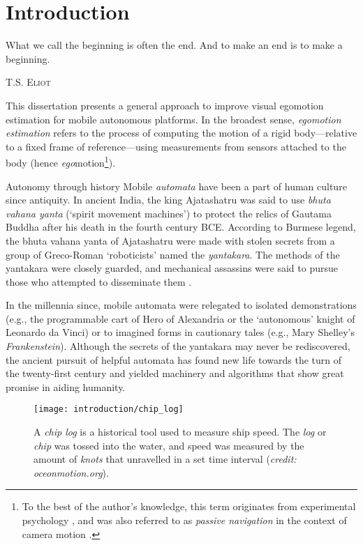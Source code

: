 \chapter{Introduction}
\label{ch:intro}
\epigraph{What we call the beginning is often the end. And to make an end is to make a beginning.}{\textsc{T.S. Eliot}}


This dissertation presents a general approach to improve visual egomotion estimation for mobile autonomous platforms.  In the broadest sense, \textit{egomotion estimation} refers to the process of computing the motion of a rigid body---relative to a fixed frame of reference---using measurements from sensors attached to the body (hence \textit{ego}motion\footnote{To the best of the author's knowledge, this term originates from experimental psychology \citep{warren1976perception}, and was also referred to as \textit{passive navigation} in the context of camera motion \citep{bruss_passive_1983}.}).  
\begin{remark}{Autonomy through history}
Mobile \textit{automata} have been a part of human culture since antiquity. In ancient India, the king Ajatashatru was said to use \textit{bhuta vahana yanta} (`spirit movement machines') to protect the relics of Gautama Buddha after his death in the fourth century BCE. According to Burmese legend, the bhuta vahana yanta of Ajatashatru were made with stolen secrets from a group of Greco-Roman `roboticists' named the \textit{yantakara}. The methods of the yantakara were closely guarded, and mechanical assassins were said to pursue those who attempted to disseminate them \citep{MayorGodsRobots2019}.

In the millennia since, mobile automata were relegated to isolated demonstrations (e.g., the programmable cart of Hero of Alexandria or the `autonomous' knight of Leonardo da Vinci) or to imagined forms in cautionary tales (e.g., Mary Shelley's \textit{Frankenstein}). Although the secrets of the yantakara may never be rediscovered, the ancient pursuit of helpful automata has found new life towards the turn of the twenty-first century and yielded machinery and algorithms that show great promise in aiding humanity.
\end{remark}
 
 \begin{wrapfigure}{r}{0.48\textwidth}
	\centering
	\texttt{[image: introduction/chip\_log]}
	\caption{A \textit{chip log} is a historical tool used to measure ship speed. The \textit{log} or \textit{chip} was tossed into the water, and speed was measured by the amount of \textit{knots} that unravelled in a set time interval (\textit{credit: oceonmotion.org}).}
	\label{fig:intro_chip_log}
\end{wrapfigure}

